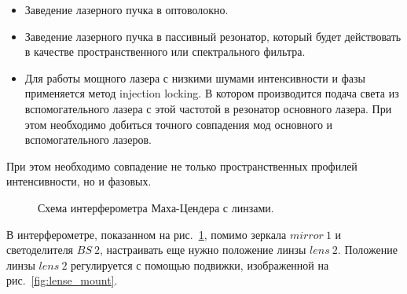 \begin{itemize}
    \item Заведение лазерного пучка в оптоволокно.
    \item Заведение лазерного пучка в пассивный резонатор, который будет действовать в качестве пространственного или спектрального фильтра.
    \item Для работы мощного лазера с низкими шумами интенсивности и фазы применяется метод injection locking. В котором производится подача света из вспомогательного лазера с этой частотой в резонатор основного лазера. При этом необходимо добиться точного совпадения мод основного и вспомогательного лазеров.
\end{itemize}

При этом необходимо совпадение не только пространственных профилей интенсивности, но и фазовых.

\begin{figure}[ht]
\caption{Схема интерферометра Маха-Цендера с линзами.}
\label{fig:MZI_expl_lenses}
\end{figure}

В интерферометре, показанном на рис.~\ref{fig:MZI_expl_lenses}, помимо зеркала $mirror\ 1$ и светоделителя $BS\ 2$, настраивать еще нужно положение линзы $lens\ 2$. Положение линзы $lens\ 2$ регулируется с помощью подвижки, изображенной на рис.~\ref{fig:lense_mount}. 

